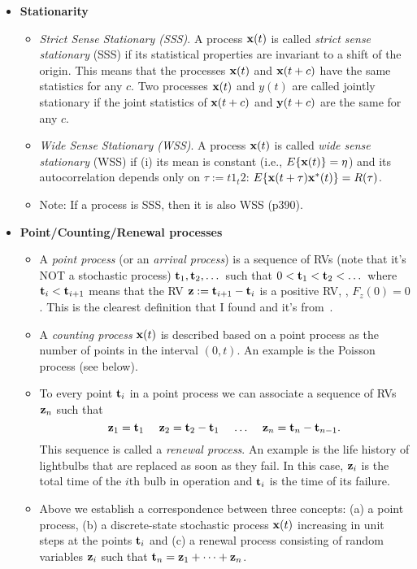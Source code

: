 \documentclass[a4paper, oneside]{book}
\begin{document}
\begin{itemize}
\item \textbf{Stationarity}
\begin{itemize}
\item \textit{Strict Sense Stationary (SSS)}. A process $\mathbf x(t)$ is called \textit{strict sense stationary} (SSS) if its statistical properties are invariant to a shift of the origin. This means that the processes $\mathbf x(t)$ and $\mathbf x(t+c)$ have the same statistics for any $c$. Two processes $\mathbf x(t)$ and $y(t)$ are called jointly stationary if the joint statistics of $\mathbf x(t+c)$ and $\mathbf y(t+c)$ are the same for any $c$.
\item \textit{Wide Sense Stationary (WSS)}. A process $\mathbf x(t)$ is called \textit{wide sense stationary} (WSS) if (i) its mean is constant (i.e., $E\{\mathbf x(t)\}=\eta$) and its autocorrelation depends only on $\tau:=t1_t2$: $E\{\mathbf x(t+\tau) \mathbf x^*(t)\} = R(\tau)$.
\item Note: If a process is SSS, then it is also WSS (p390).
\end{itemize}
\item \textbf{Point/Counting/Renewal processes}
	\begin{itemize}
	\item A \textit{point process} (or an \textit{arrival process}) is a sequence of RVs (note that it's NOT a stochastic process) $\mathbf t_1, \mathbf t_2, \dots$ such that $0 < \mathbf t_1 < \mathbf t_2 < \dots$ where $\mathbf t_i < \mathbf t_{i+1}$ means that the RV $\mathbf z:=\mathbf t_{i+1}-\mathbf t_i$ is a positive RV, \ie, $F_z(0) = 0$. This is the clearest definition that  I found and it's from~\cite{gallagher_ch2}.
	\item A \textit{counting process} $\mathbf x(t)$ is described based on a point process as the number of points in the interval $(0, t)$. An example is the Poisson process (see below).
	\item To every point $\mathbf t_i$ in a point process  we can associate a sequence of RVs $\mathbf z_n$ such that
	\begin{equation}
	\mathbf z_1 = \mathbf t_1\,\,\,\,\,\,\,\, \mathbf z_2 = \mathbf t_2-\mathbf t_1\,\,\,\,\,\,\, \dots \,\,\,\,\,\,\, \mathbf z_n = \mathbf t_n-\mathbf t_{n-1}.
	\end{equation}
	This sequence is called a \textit{renewal process}. An example is the life history of lightbulbs that are replaced as soon as they fail. In this case, $\mathbf z_i$ is the total time of the $i$th bulb in operation and $\mathbf t_i$ is the time of its failure.
	\item Above we establish a correspondence between three concepts: (a) a point process, (b) a discrete-state stochastic process $\mathbf x(t)$ increasing in unit steps at the points $\mathbf t_i$ and (c) a renewal process consisting of random variables $\mathbf z_i$ such that $\mathbf t_n = \mathbf z_1 + \dots + \mathbf z_n$.
	

\end{itemize}
\end{itemize}
\end{document}
